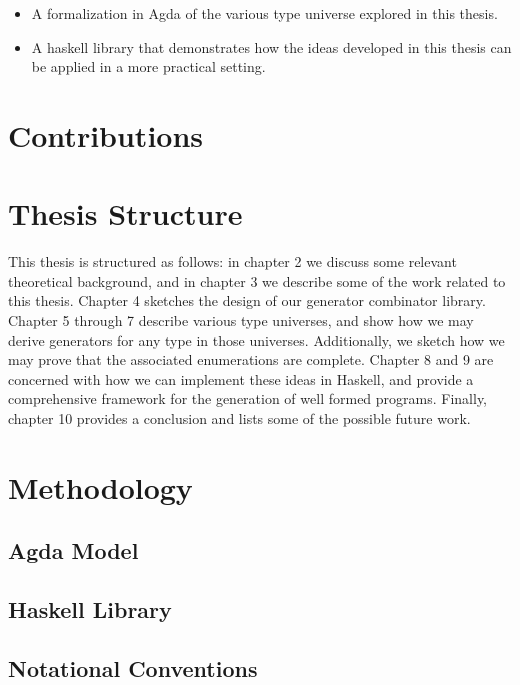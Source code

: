 \documentclass[a4paper,msc,twosized=semi]{uustthesis}
\begin{document}
  \begin{itemize}
    \item A formalization in Agda of the various type universe explored in this thesis.
    
    \item A haskell library that demonstrates how the ideas developed in this thesis can be applied in a more practical setting. 
  \end{itemize}

\section{Contributions}

\section{Thesis Structure}

  This thesis is structured as follows: in chapter 2 we discuss some relevant 
  theoretical background, and in chapter 3 we describe some of the work related to 
  this thesis. Chapter 4 sketches the design of our generator combinator library. 
  Chapter 5 through 7 describe various type universes, and show how we may derive 
  generators for any type in those universes. Additionally, we sketch how we may prove 
  that the associated enumerations are complete. Chapter 8 and 9 are concerned with 
  how we can implement these ideas in Haskell, and provide a comprehensive framework 
  for the generation of well formed programs. Finally, chapter 10 provides a 
  conclusion and lists some of the possible future work.

\section{Methodology}

\subsection{Agda Model}

\subsection{Haskell Library}

\subsection{Notational Conventions}
\end{document}

